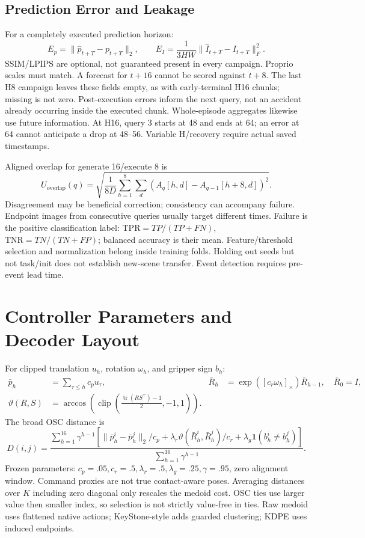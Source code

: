 \documentclass{article}
\newcommand{\ind}{\mathbf{1}}
\DeclareMathOperator{\clip}{clip}
\DeclareMathOperator{\tr}{tr}
\begin{document}
\subsection{Prediction Error and Leakage}
For a completely executed prediction horizon:
\begin{equation}
E_p=\|\widehat p_{t+T}-p_{t+T}\|_2,\qquad
E_I=\frac1{3HW}\|\widehat I_{t+T}-I_{t+T}\|_F^2.
\end{equation}
SSIM/LPIPS are optional, not guaranteed present in every campaign.
Proprio scales must match. A forecast for $t+16$ cannot be scored against $t+8$.
The last H8 campaign leaves these fields empty, as with early-terminal H16
chunks; missing is not zero. Post-execution errors inform the next query,
not an accident already occurring inside the executed chunk.
Whole-episode aggregates likewise use future information.
At H16, query 3 starts at 48 and ends at 64; an error at 64 cannot anticipate
a drop at 48--56. Variable H/recovery require actual saved timestamps.

Aligned overlap for generate 16/execute 8 is
\begin{equation}
U_{\mathrm{overlap}}(q)=\sqrt{\frac1{8D}\sum_{h=1}^{8}\sum_d
(A_q[h,d]-A_{q-1}[h+8,d])^2}.
\end{equation}
Disagreement may be beneficial correction; consistency can accompany failure.
Endpoint images from consecutive queries usually target different times.
Failure is the positive classification label:
$\mathrm{TPR}=TP/(TP+FN)$, $\mathrm{TNR}=TN/(TN+FP)$;
balanced accuracy is their mean. Feature/threshold selection and normalization
belong inside training folds. Holding out seeds but not task/init does not
establish new-scene transfer. Event detection requires pre-event lead time.

\section{Controller Parameters and Decoder Layout}
\label{app:geometry}
For clipped translation $u_h$, rotation $\omega_h$, and gripper sign $b_h$:
\begin{align}
\bar p_h&=\sum_{\tau\le h}c_pu_\tau,&
\bar R_h&=\exp([c_r\omega_h]_\times)\bar R_{h-1},\quad\bar R_0=I,\\
\vartheta(R,S)&=\arccos\left(\clip\left(\frac{\tr(RS^\top)-1}{2},-1,1\right)\right).
\end{align}
The broad OSC distance is
\begin{equation}
D(i,j)=\frac{\sum_{h=1}^{16}\gamma^{h-1}
[\|\bar p_h^i-\bar p_h^j\|_2/c_p+
\lambda_r\vartheta(\bar R_h^i,\bar R_h^j)/c_r+
\lambda_g\ind(b_h^i\ne b_h^j)]}{\sum_{h=1}^{16}\gamma^{h-1}}.
\end{equation}
Frozen parameters: $c_p=.05,c_r=.5,\lambda_r=.5,\lambda_g=.25,\gamma=.95$,
zero alignment window. Command proxies are not true contact-aware poses.
Averaging distances over $K$ including zero diagonal only rescales the medoid
cost. OSC ties use larger value then smaller index, so selection is not
strictly value-free in ties. Raw medoid uses flattened native actions;
KeyStone-style adds guarded clustering; KDPE uses induced endpoints.
\end{document}
